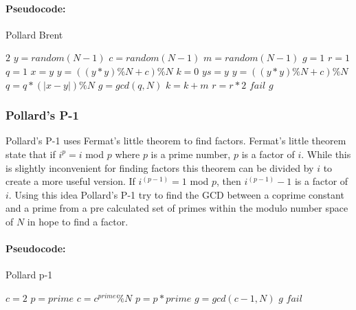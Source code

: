 \paragraph{Pseudocode:}

\textcolor{white}{ }

\begin{algorithm}[H]
\caption{Pollard Brent}
\begin{algorithmic}
	 	\State \Return $2$
	\EndIf
	\State $y = random(N-1)$
	\State $c = random(N-1)$
	\State $m = random(N-1)$
	\State $g = 1$
	\State $r = 1$
	\State $q = 1$
		\State $x = y$
			\State $y = ((y*y)\%N+c)\%N$
		\EndFor
		\State $k = 0$
			\State $ys = y$
				\State $y = ((y*y)\%N+c)\%N$
				\State $q = q * (|x-y|)\%N$
			\EndFor
			\State $g = gcd(q,N)$
			\State $k = k + m$
		\EndWhile
		\State $r = r * 2$ 
	\EndWhile
		\State \Return $fail$
	\EndIf
	\State \Return $g$	
\EndFunction
\end{algorithmic}
\end{algorithm}

\subsubsection{Pollard's P-1}

Pollard's P-1 uses Fermat's little theorem to find factors. Fermat's little theorem state that if $i^p = i$ mod $p$ where $p$ is a prime number, $p$ is a factor of $i$. While this is slightly inconvenient for finding factors this theorem can be divided by $i$ to create a more useful version. If $i^{(p-1)} = 1$ mod $p$, then $i^{(p-1)} - 1$ is a factor of $i$.
Using this idea Pollard's P-1 try to find the GCD between a coprime constant and a prime from a pre calculated set of primes within the modulo number space of $N$ in hope to find a factor.

\paragraph{Pseudocode:}

\textcolor{white}{ }

\begin{algorithm}[H]
\caption{Pollard p-1}
\begin{algorithmic}
	\State $c = 2$
		\State$p = prime$
			\State $c = c^{prime}\%N$
			\State $p = p * prime$
		\EndWhile
	\EndFor
	\State $g = gcd(c-1,N)$
		\State \Return $g$
	\Else
		\State \Return $fail$
	\EndIf
\EndFunction
\end{algorithmic}
\end{algorithm}

